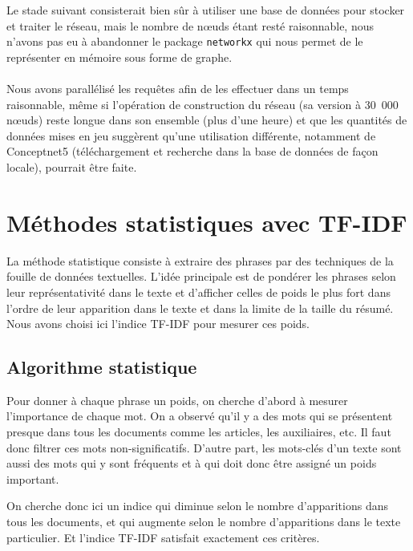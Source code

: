 \documentclass[a4paper, 12pt]{article}
\newcommand{\pyt}[1]{\texttt{#1}}%
\begin{document}
Le stade suivant consisterait bien sûr à utiliser une base de données pour stocker et traiter le réseau, mais le nombre de n\oe{}uds étant resté raisonnable, nous n'avons pas eu à abandonner le package \pyt{networkx} qui nous permet de le représenter en mémoire sous forme de graphe.

\paragraph{}
Nous avons parallélisé les requêtes afin de les effectuer dans un temps raisonnable, même si l'opération de construction du réseau (sa version à 30~000 n\oe{}uds) reste longue dans son ensemble (plus d'une heure) et que les quantités de données mises en jeu suggèrent qu'une utilisation différente, notamment de Conceptnet5 (téléchargement et recherche dans la base de données de façon locale), pourrait être faite.



\section{Méthodes statistiques avec TF-IDF}\label{Section:TFIDF}

La méthode statistique consiste à extraire des phrases par des techniques de la fouille de données textuelles. L'idée principale est de pondérer les phrases selon leur représentativité dans le texte et d'afficher celles de poids le plus fort dans l'ordre de leur apparition dans le texte et dans la limite de la taille du résumé. Nous avons choisi ici l'indice TF-IDF pour mesurer ces poids.

\subsection{Algorithme statistique}

Pour donner à chaque phrase un poids, on cherche d'abord à mesurer l'importance de chaque mot. On a observé qu'il y a des mots qui se présentent presque dans tous les documents comme les articles, les auxiliaires, etc. Il faut donc filtrer ces mots non-significatifs. D'autre part, les mots-clés d'un texte sont aussi des mots qui y sont fréquents et à qui doit donc être assigné un poids important.

On cherche donc ici un indice qui diminue selon le nombre d'apparitions dans tous les documents, et qui augmente selon le nombre d'apparitions dans le texte particulier. Et l'indice TF-IDF satisfait exactement ces critères.
\end{document}
